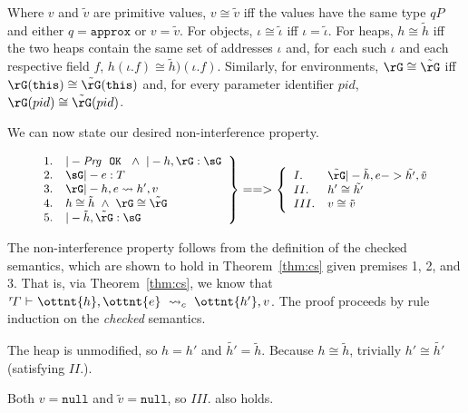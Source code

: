 Where $v$ and $\tilde{v}$ are primitive values, $v \cong \tilde{v}$ iff the
values have the same type $qP$ and either $q = \mathtt{approx}$ or $v =
\tilde{v}$. For objects, $\iota \cong \tilde{\iota}$ iff $\iota =
\tilde{\iota}$.
For heaps, $h \cong \tilde{h}$ iff the two heaps contain the same set of
addresses $\iota$ and, for each such $\iota$ and each respective field
$f$, $h(\iota.f) \cong \tilde{h})(\iota.f)$. Similarly, for environments,
$\rG \cong \tilde{\rG}$ iff
$\rG(\texttt{this}) \cong \tilde{\rG}(\texttt{this})$ and, for every parameter
identifier $pid$, $\rG(pid) \cong \tilde{\rG}(pid)$.

We can now state our desired non-interference property.

\begin{theorem}
\label{thm:ni}
\[
\small
\left.
\begin{array}{ll}
1. & |- \mathit{Prg}\ \ \mathtt{OK} \ \ \wedge\  |- h, \rG : \sG\\
2. & \sG |- e : T\\
3. & \rG |- h, e \leadsto h', v\\
4. & h \cong \tilde{h}  \ \wedge\  \rG \cong \tilde{\rG}\\
5. & |- \tilde{h}, \tilde{\rG} : \sG\\
\end{array}
\right\}
==>
\left\{
\begin{array}{ll}
I. & \tilde{\rG} |- \tilde{h}, e -> \tilde{h'}, \tilde{v}\\
II. & h' \cong \tilde{h'}\\
III. & v \cong \tilde{v}
\end{array}
\right.
\]
\end{theorem}

The non-interference property follows from the definition of the checked
semantics, which are shown to hold in Theorem~\ref{thm:cs} given premises 1, 2,
and 3. That
is, via Theorem~\ref{thm:cs}, we know that 
$ \mathit{ {^r}\!\Gamma} \  \textsf{$\vdash$} \  \ottnt{h} ,  \ottnt{e} \ \leadsto_{c}\  \ottnt{h'} ,  v $. The proof proceeds by rule induction on the
\emph{checked} semantics.


The heap is unmodified, so $h = h'$ and $\tilde{h'} = \tilde{h}$. Because
$h \cong \tilde{h}$, trivially $h' \cong \tilde{h'}$ (satisfying $II.$).

Both $v = \mathtt{null}$ and $\tilde{v} = \mathtt{null}$, so $III.$ also holds.

